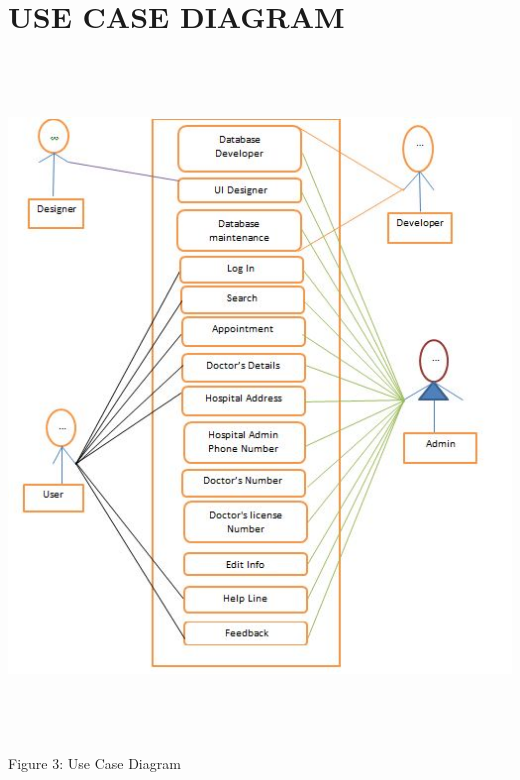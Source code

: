 \documentclass[12pt]{article}
\begin{document}
\section{USE CASE DIAGRAM}
\includegraphics[height=18cm]{Use.PNG}
\begin{center}
 \caption{ Figure 3: Use Case Diagram}
    
\end{center}
\pagebreak
\end{document}
